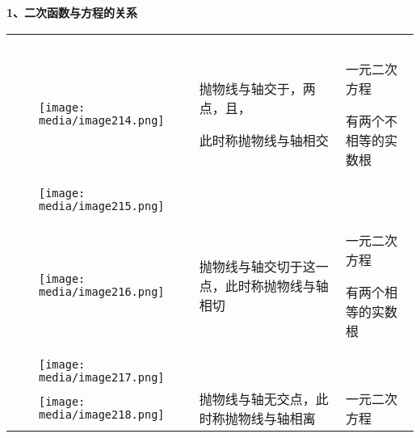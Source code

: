 \documentclass[a4paper,11pt,UTF8]{ctexart}
\begin{document}
\textbf{1、二次函数与方程的关系}

\begin{longtable}[]{@{}lllll@{}}
\toprule
\endhead
& & & &\tabularnewline
& & & &\tabularnewline
\begin{minipage}[t]{0.17\columnwidth}\raggedright
\strut
\end{minipage} & \begin{minipage}[t]{0.17\columnwidth}\raggedright
\strut
\end{minipage} & \begin{minipage}[t]{0.17\columnwidth}\raggedright
\texttt{[image: media/image214.png]}\strut
\end{minipage} & \begin{minipage}[t]{0.17\columnwidth}\raggedright
抛物线与轴交于，两点，且，

此时称抛物线与轴相交\strut
\end{minipage} & \begin{minipage}[t]{0.17\columnwidth}\raggedright
一元二次方程

有两个不相等的实数根\strut
\end{minipage}\tabularnewline
& &
\texttt{[image: media/image215.png]} &
&\tabularnewline
\begin{minipage}[t]{0.17\columnwidth}\raggedright
\strut
\end{minipage} & \begin{minipage}[t]{0.17\columnwidth}\raggedright
\strut
\end{minipage} & \begin{minipage}[t]{0.17\columnwidth}\raggedright
\texttt{[image: media/image216.png]}\strut
\end{minipage} & \begin{minipage}[t]{0.17\columnwidth}\raggedright
抛物线与轴交切于这一点，此时称抛物线与轴相切\strut
\end{minipage} & \begin{minipage}[t]{0.17\columnwidth}\raggedright
一元二次方程

有两个相等的实数根\strut
\end{minipage}\tabularnewline
& &
\texttt{[image: media/image217.png]} &
&\tabularnewline
\begin{minipage}[t]{0.17\columnwidth}\raggedright
\strut
\end{minipage} & \begin{minipage}[t]{0.17\columnwidth}\raggedright
\strut
\end{minipage} & \begin{minipage}[t]{0.17\columnwidth}\raggedright
\texttt{[image: media/image218.png]}\strut
\end{minipage} & \begin{minipage}[t]{0.17\columnwidth}\raggedright
抛物线与轴无交点，此时称抛物线与轴相离\strut
\end{minipage} & \begin{minipage}[t]{0.17\columnwidth}\raggedright
一元二次方程


\end{minipage}
\end{longtable}
\end{document}
